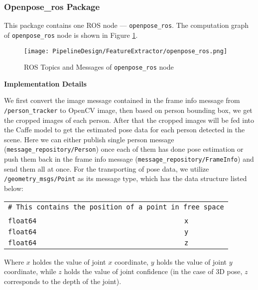 \subsubsection{Openpose\_ros Package}

This package contains one ROS node --- \texttt{openpose\_ros}. The computation graph of \texttt{openpose\_ros} node is shown in Figure \ref{fig:openpose_ros}. 

\begin{figure}[H]
  \centering
  \texttt{[image: PipelineDesign/FeatureExtractor/openpose\_ros.png]}
  \caption{ROS Topics and Messages of \texttt{openpose\_ros} node}
  \label{fig:openpose_ros}
\end{figure}  

\textbf{Implementation Details}

We first convert the image message contained in the frame info message from \texttt{/person\_tracker} to OpenCV image, then based on person bounding box, we get the cropped images of each person. After that the cropped images will be fed into the Caffe model to get the estimated pose data for each person detected in the scene. Here we can either publish single person message (\texttt{message\_repository/Person}) once each of them has done pose estimation or push them back in the frame info message (\texttt{message\_repository/FrameInfo}) and send them all at once. For the transporting of pose data, we utilize \texttt{/geometry\_msgs/Point} as its message type, which has the data structure listed below:

\begin{table}[H]
\begin{tabular}{|lll|}
\hline
\multicolumn{3}{|l|}{\texttt{\# This contains the position of a point in free space}} \\
                             &                       &                       \\
\texttt{float64}             &                       & \texttt{x}            \\
\texttt{float64}             &                       & \texttt{y}            \\
\texttt{float64}             &                       & \texttt{z}            \\ \hline
\end{tabular}
\end{table} 

Where $x$ holdes the value of joint $x$ coordinate, $y$ holds the value of joint $y$ coordinate, while $z$ holds the value of joint confidence (in the case of 3D pose, $z$ corresponds to the depth of the joint). 

